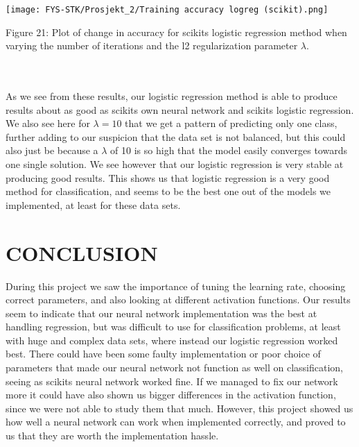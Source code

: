 \documentclass[english,notitlepage,reprint,nofootinbib]{revtex4-1}  %
\begin{document}
\texttt{[image: FYS-STK/Prosjekt\_2/Training accuracy logreg (scikit).png]}
\caption{Figure 21: Plot of change in accuracy for scikits logistic regression method when varying the number of iterations and the l2 regularization parameter $\lambda$.}
\\
\\
As we see from these results, our logistic regression method is able to produce results about as good as scikits own neural network and scikits logistic regression. We also see here for $\lambda = 10$ that we get a pattern of predicting only one class, further adding to our suspicion that the data set is not balanced, but this could also just be because a $\lambda$ of 10 is so high that the model easily converges towards one single solution. We see however that our logistic regression is very stable at producing good results. This shows us that logistic regression is a very good method for classification, and seems to be the best one out of the models we implemented, at least for these data sets.

\section{CONCLUSION}\label{sec:CONCLUSION}
During this project we saw the importance of tuning the learning rate, choosing correct parameters, and also looking at different activation functions. Our results seem to indicate that our neural network implementation was the best at handling regression, but was difficult to use for classification problems, at least with huge and complex data sets, where instead our logistic regression worked best. There could have been some faulty implementation or poor choice of parameters that made our neural network not function as well on classification, seeing as scikits neural network worked fine. If we managed to fix our network more it could have also shown us bigger differences in the activation function, since we were not able to study them that much. However, this project showed us how well a neural network can work when implemented correctly, and proved to us that they are worth the implementation hassle. 
\end{document}
